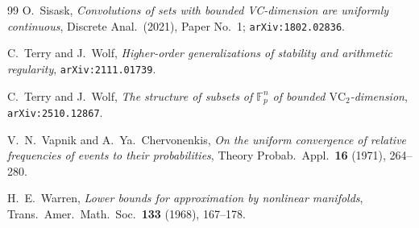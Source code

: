 \documentclass[11pt,a4paper]{article}
\theoremstyle{plain}
\theoremstyle{definition}
\begin{document}
\begin{thebibliography}{99}
O.~Sisask,
\emph{Convolutions of sets with bounded VC-dimension are uniformly continuous},
Discrete Anal.\ (2021), Paper No.~1;
\texttt{arXiv:1802.02836}.

C.~Terry and J.~Wolf,
\emph{Higher-order generalizations of stability and arithmetic regularity},
\texttt{arXiv:2111.01739}.

C.~Terry and J.~Wolf,
\emph{The structure of subsets of $\mathbb{F}_p^n$ of bounded $\mathrm{VC}_2$-dimension},
\texttt{arXiv:2510.12867}.

V.~N.~Vapnik and A.~Ya.~Chervonenkis,
\emph{On the uniform convergence of relative frequencies of events to their probabilities},
Theory Probab.\ Appl.\ \textbf{16} (1971), 264--280.

H.~E.~Warren,
\emph{Lower bounds for approximation by nonlinear manifolds},
Trans.\ Amer.\ Math.\ Soc.\ \textbf{133} (1968), 167--178.

\end{thebibliography}
\end{document}
